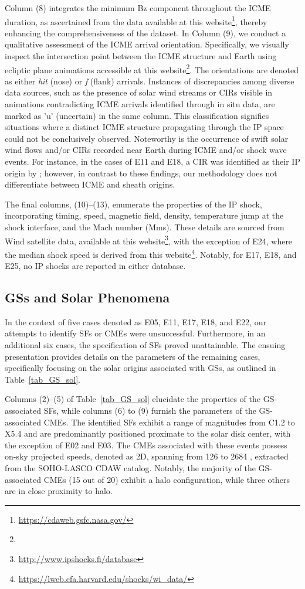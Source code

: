 Column (8) integrates the minimum Bz component throughout the ICME duration, as ascertained from the data available at this website\footnote{\url{https://cdaweb.gsfc.nasa.gov/}}, thereby enhancing the comprehensiveness of the dataset. In Column (9), we conduct a qualitative assessment of the ICME arrival orientation. Specifically, we visually inspect the intersection point between the ICME structure and Earth using ecliptic plane animations accessible at this website\footnote{\helioweatherurl}. The orientations are denoted as either \textit{hit} (nose) or \textit{f} (flank) arrivals. Instances of discrepancies among diverse data sources, such as the presence of solar wind streams or CIRs visible in animations contradicting ICME arrivals identified through in situ data, are marked as 'u' (uncertain) in the same column. This classification signifies situations where a distinct ICME structure propagating through the IP space could not be conclusively observed. Noteworthy is the occurrence of swift solar wind flows and/or CIRs recorded near Earth during ICME and/or shock wave events. For instance, in the cases of E11 and E18, a CIR was identified as their IP origin by \citet{qiu_2022}; however, in contrast to these findings, our methodology does not differentiate between ICME and sheath origins.

The final columns, (10)–(13), enumerate the properties of the IP shock, incorporating timing, speed, magnetic field, density, temperature jump at the shock interface, and the Mach number (Mms). These details are sourced from Wind satellite data, available at this website\footnote{\url{http://www.ipshocks.fi/database}}, with the exception of E24, where the median shock speed is derived from this website\footnote{\url{https://lweb.cfa.harvard.edu/shocks/wi_data/}}. Notably, for E17, E18, and E25, no IP shocks are reported in either database.

\subsection{GSs and Solar Phenomena}
In the context of five cases denoted as E05, E11, E17, E18, and E22, our attempts to identify SFs or CMEs were unsuccessful. Furthermore, in an additional six cases, the specification of SFs proved unattainable. The ensuing presentation provides details on the parameters of the remaining cases, specifically focusing on the solar origins associated with GSs, as outlined in Table~\ref{tab_GS_sol}.

Columns (2)–(5) of Table~\ref{tab_GS_sol} elucidate the properties of the GS-associated SFs, while columns (6) to (9) furnish the parameters of the GS-associated CMEs. The identified SFs exhibit a range of magnitudes from C1.2 to X5.4 and are predominantly positioned proximate to the solar disk center, with the exception of E02 and E03. The CMEs associated with these events possess on-sky projected speeds, denoted as 2D, spanning from 126 to 2684 \kms, extracted from the SOHO-LASCO CDAW catalog. Notably, the majority of the GS-associated CMEs (15 out of 20) exhibit a halo configuration, while three others are in close proximity to halo.

